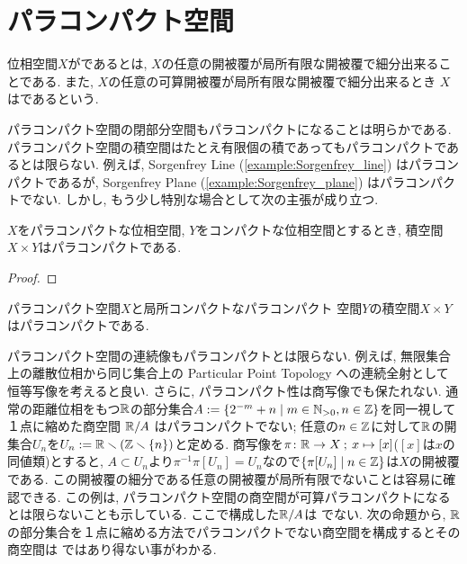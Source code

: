 \documentclass[uplatex, dvipdfmx, a4paper, 12pt, class=jsbook, crop=false]{standalone}
\begin{document}
\section{パラコンパクト空間}
\label{sec:paracompact-spaces}

\newcommand{\starset}[2]{\mathrm{St}\left(#1 , \: #2\right)}
\newcommand{\sstarset}[3]{\mathrm{St}^{#1}\left(#2 , \: #3 \right)}

\begin{definition}
	位相空間$ X $がであるとは,
	$ X $の任意の開被覆が局所有限な開被覆で細分出来ることである.
	また, $ X $の任意の可算開被覆が局所有限な開被覆で細分出来るとき
	$ X $はであるという.
\end{definition}

パラコンパクト空間の閉部分空間もパラコンパクトになることは明らかである.
パラコンパクト空間の積空間はたとえ有限個の積であってもパラコンパクトであるとは限らない.
例えば, Sorgenfrey Line (\ref{example:Sorgenfrey_line}) はパラコンパクトであるが,
Sorgenfrey Plane (\ref{example:Sorgenfrey_plane}) はパラコンパクトでない.
しかし, もう少し特別な場合として次の主張が成り立つ.

\begin{proposition}
	$ X $をパラコンパクトな位相空間, $ Y $をコンパクトな位相空間とするとき, 積空間$ X \times Y $はパラコンパクトである.
\end{proposition}
\begin{proof}
	\WIP
\end{proof}

\begin{proposition}
	パラコンパクト空間$ X $と局所コンパクトなパラコンパクト  空間$ Y $の積空間$ X \times Y $はパラコンパクトである.
\end{proposition}

パラコンパクト空間の連続像もパラコンパクトとは限らない.
例えば, 無限集合上の離散位相から同じ集合上の Particular Point Topology への連続全射として恒等写像を考えると良い.
さらに, パラコンパクト性は商写像でも保たれない.
通常の距離位相をもつ$ \mathbb{R} $の部分集合$ A \defeq \setcomp{2^{-m}+n}{m \in \N_{>0}, n \in \Z} $を同一視して１点に縮めた商空間
$ \mathbb{R} / A $ はパラコンパクトでない; 任意の$ n \in \mathbb{Z} $に対して$ \mathbb{R} $の開集合$ U_n $を$ U_n \mathrel{:=} \mathbb{R} \smallsetminus (\mathbb{Z} \smallsetminus \{n\}) $と定める.
商写像を$ \pi \colon \mathbb{R} \to X \mathpunct{\: ; \:} x \mapsto [x] $($ [x] $は$ x $の同値類)とすると,
$ A \subset U_n $より$ \pi^{-1}\pi[U_n] = U_n $なので$ \setcomp{\pi[U_n]}{n \in \Z} $は$ X $の開被覆である.
この開被覆の細分である任意の開被覆が局所有限でないことは容易に確認できる.
この例は, パラコンパクト空間の商空間が可算パラコンパクトになるとは限らないことも示している.
ここで構成した$ \mathbb{R} / A $は  でない.
次の命題から, $ \mathbb{R} $の部分集合を１点に縮める方法でパラコンパクトでない商空間を構成するとその商空間は  ではあり得ない事がわかる.
\end{document}
